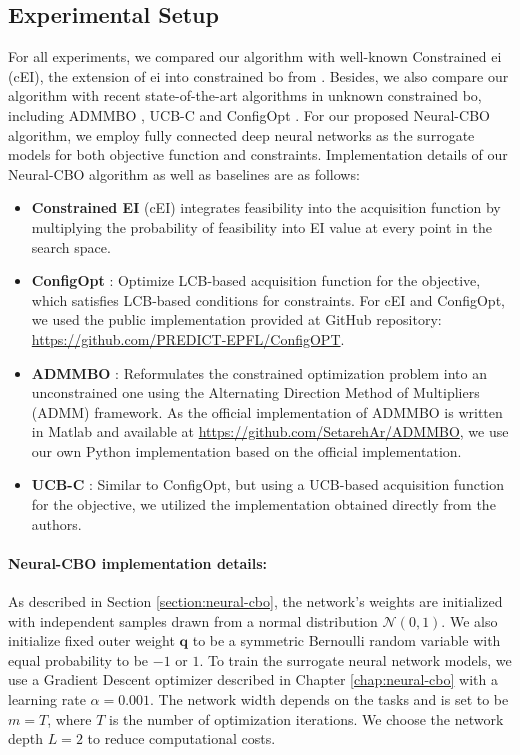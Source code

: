 \subsection{Experimental Setup}
\label{section:neural-cbo_baselines}
For all experiments, we compared our algorithm with well-known Constrained \ac{ei} (cEI), the extension of \ac{ei} into constrained \ac{bo} from \citet{gardner2014bayesian}. Besides, we also compare our algorithm with recent state-of-the-art algorithms in unknown constrained \ac{bo}, including ADMMBO \citep{ariafar2019admmbo}, UCB-C \citep{nguyen2023optimistic} and ConfigOpt \citep{xu2023constrained}. For our proposed Neural-CBO algorithm, we employ fully connected deep neural networks as the surrogate models for both objective function and constraints. Implementation details of our Neural-CBO algorithm as well as baselines are as follows:
\begin{itemize}
    \item  \textbf{Constrained EI} (cEI) \citep{gardner2014bayesian} integrates feasibility into the acquisition function by multiplying the probability of feasibility into EI value at every point in the search space.
    \item \textbf{ConfigOpt} \citep{xu2023constrained}: Optimize LCB-based acquisition function for the objective, which satisfies LCB-based conditions for constraints. For cEI and ConfigOpt, we used the public implementation provided at GitHub repository: \url{https://github.com/PREDICT-EPFL/ConfigOPT}.
    \item \textbf{ADMMBO} \citep{ariafar2019admmbo}: Reformulates the constrained optimization problem into an unconstrained one using the Alternating Direction Method of Multipliers (ADMM) framework. As the official implementation of ADMMBO is written in Matlab and available at \url{https://github.com/SetarehAr/ADMMBO}, we use our own Python implementation based on the official implementation.  
    \item \textbf{UCB-C} \citep{nguyen2023optimistic}: 
    Similar to ConfigOpt, but using a UCB-based acquisition function for the objective, we utilized the implementation obtained directly from the authors.
\end{itemize}
\paragraph{Neural-CBO implementation details:}
As described in Section \ref{section:neural-cbo}, the network's weights are initialized with independent samples drawn from a normal distribution $\mathcal{N} (0, 1)$. We also initialize fixed outer weight $\mathbf{q}$ to be a symmetric Bernoulli random variable with equal probability to be $-1$ or $1$. To train the surrogate neural network models, we use a Gradient Descent optimizer described in Chapter \ref{chap:neural-cbo} with a learning rate $\alpha = 0.001$. The network width depends on the tasks and is set to be $m = T$, where $T$ is the number of optimization iterations. We choose the network depth $L=2$ to reduce computational costs. 

